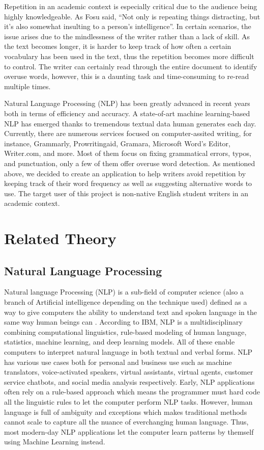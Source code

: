 \documentclass[12pt,oneside,openright,a4paper]{cpe-english-project}
\begin{document}
Repetition in an academic context is especially critical due to the audience being highly knowledgeable. As Fosu \cite{a} said, “Not only is repeating things distracting, but it’s also somewhat insulting to a person’s intelligence”. In certain scenarios, the issue arises due to the mindlessness of the writer rather than a lack of skill. As the text becomes longer, it is harder to keep track of how often a certain vocabulary has been used in the text, thus the repetition becomes more difficult to control. The writer can certainly read through the entire document to identify overuse words, however, this is a daunting task and time-consuming to re-read multiple times.

Natural Language Processing (NLP) has been greatly advanced in recent years both in terms of efficiency and accuracy. A state-of-art machine learning-based NLP has emerged thanks to tremendous textual data human generates each day. Currently, there are numerous services focused on computer-assited writing, for instance, Grammarly, Prowritingaid, Gramara, Microsoft Word’s Editor, Writer.com, and more. Most of them focus on fixing grammatical errors, typos, and punctuation, only a few of them offer overuse word detection. As mentioned above, we decided to create an application to help writers avoid repetition by keeping track of their word frequency as well as suggesting alternative words to use. The target user of this project is non-native English student writers in an academic context.
\section{Related Theory}
\subsection{Natural Language Processing}
Natural language Processing (NLP) is a sub-field of computer science (also a branch of Artificial intelligence depending on the technique used) defined as a way to give computers the ability to understand text and spoken language in the same way human beings can \cite{c}. According to IBM,  NLP is a multidisciplinary combining computational linguistics, rule-based modeling of human language, statistics, machine learning, and deep learning models. All of these enable computers to interpret natural language in both textual and verbal forms.  NLP has various use cases both for personal and business use such as machine translators, voice-activated speakers, virtual assistants, virtual agents, customer service chatbots, and social media analysis respectively. Early, NLP applications often rely on a rule-based approach which means the programmer must hard code all the linguistic rules to let the computer perform NLP tasks. However, human language is full of ambiguity and exceptions which makes traditional methods cannot scale to capture all the nuance of everchanging human language. Thus, most modern-day NLP applications let the computer learn patterns by themself using Machine Learning instead.
\end{document}

